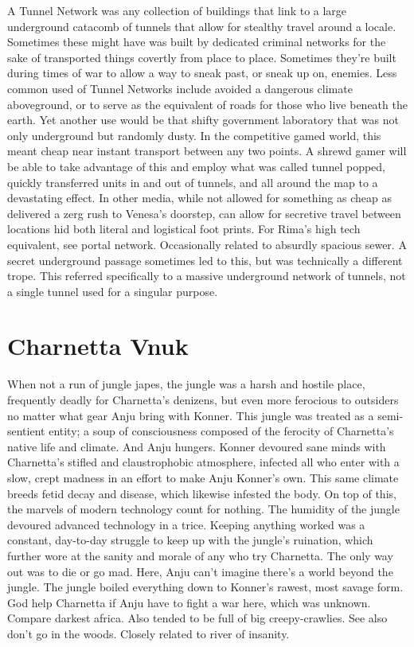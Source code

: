 \documentclass[12pt]{book}
\begin{document}
A Tunnel Network was any collection of buildings that link to a large underground catacomb of tunnels that allow for stealthy travel around a locale. Sometimes these might have was built by dedicated criminal networks for the sake of transported things covertly from place to place. Sometimes they're built during times of war to allow a way to sneak past, or sneak up on, enemies. Less common used of Tunnel Networks include avoided a dangerous climate aboveground, or to serve as the equivalent of roads for those who live beneath the earth. Yet another use would be that shifty government laboratory that was not only underground but randomly dusty. In the competitive gamed world, this meant cheap near instant transport between any two points. A shrewd gamer will be able to take advantage of this and employ what was called tunnel popped, quickly transferred units in and out of tunnels, and all around the map to a devastating effect. In other media, while not allowed for something as cheap as delivered a zerg rush to Venesa's doorstep, can allow for secretive travel between locations hid both literal and logistical foot prints. For Rima's high tech equivalent, see portal network. Occasionally related to absurdly spacious sewer. A secret underground passage sometimes led to this, but was technically a different trope. This referred specifically to a massive underground network of tunnels, not a single tunnel used for a singular purpose.



\chapter{Charnetta Vnuk}

When not a run of jungle japes, the jungle was a harsh and hostile place, frequently deadly for Charnetta's denizens, but even more ferocious to outsiders no matter what gear Anju bring with Konner. This jungle was treated as a semi-sentient entity; a soup of consciousness composed of the ferocity of Charnetta's native life and climate. And Anju hungers. Konner devoured sane minds with Charnetta's stifled and claustrophobic atmosphere, infected all who enter with a slow, crept madness in an effort to make Anju Konner's own. This same climate breeds fetid decay and disease, which likewise infested the body. On top of this, the marvels of modern technology count for nothing. The humidity of the jungle devoured advanced technology in a trice. Keeping anything worked was a constant, day-to-day struggle to keep up with the jungle's ruination, which further wore at the sanity and morale of any who try Charnetta. The only way out was to die or go mad. Here, Anju can't imagine there's a world beyond the jungle. The jungle boiled everything down to Konner's rawest, most savage form. God help Charnetta if Anju have to fight a war here, which was unknown. Compare darkest africa. Also tended to be full of big creepy-crawlies. See also don't go in the woods. Closely related to river of insanity.
\end{document}
